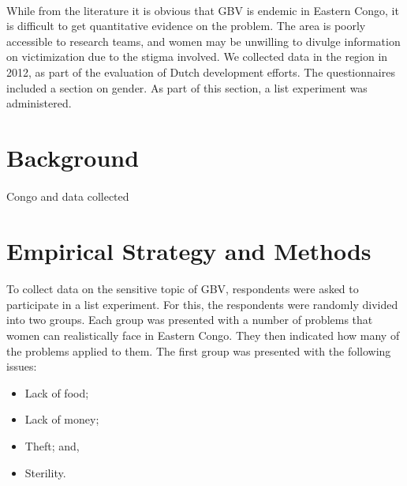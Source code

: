 \documentclass[11pt,a4paper]{scrartcl} %
\begin{document}
\paragraph{}
While from the literature it is obvious that GBV is endemic in Eastern Congo, it is difficult to get quantitative evidence on the problem. The area is poorly accessible to research teams, and women may be unwilling to divulge information on victimization due to the stigma involved. We collected data in the region in 2012, as part of the evaluation of Dutch development efforts. The questionnaires included a section on gender. As part of this section, a list experiment was administered.

\paragraph{}


\section*{Background}
\paragraph{}
Congo and data collected

\section*{Empirical Strategy and Methods}
\paragraph{}
To collect data on the sensitive topic of GBV, respondents were asked to participate in a list experiment. For this, the respondents were randomly divided into two groups. Each group was presented with a number of problems that women can realistically face in Eastern Congo. They then indicated how many of the problems applied to them. The first group was presented with the following issues:
\begin{itemize}
	\item Lack of food;
	\item Lack of money;
	\item Theft; and,
	\item Sterility.
\end{itemize}
\end{document}
